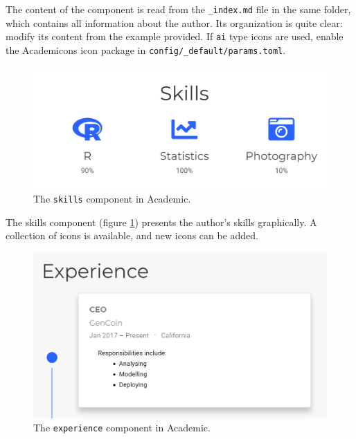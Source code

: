 \documentclass[
  12pt,
  american,
  a4paper,
  extrafontsizes,onecolumn,openright
  ]{memoir}
\begin{document}
The content of the component is read from the \texttt{\_index.md} file in the same folder, which contains all information about the author.
Its organization is quite clear: modify its content from the example provided.
If \texttt{ai} type icons are used, enable the Academicons icon package in \texttt{config/\_default/params.toml}.



\scriptsize

\begin{figure}

{\centering \includegraphics[width=0.8\linewidth]{images/rediger-skills} 

}

\caption{The \texttt{skills} component in Academic.}\label{fig:rediger-skills}
\end{figure}

\normalsize

The skills component (figure \ref{fig:rediger-skills}) presents the author's skills graphically.
A collection of icons is available, and new icons can be added.



\scriptsize

\begin{figure}

{\centering \includegraphics[width=0.8\linewidth]{images/rediger-experience} 

}

\caption{The \texttt{experience} component in Academic.}\label{fig:rediger-experience}
\end{figure}
\end{document}
